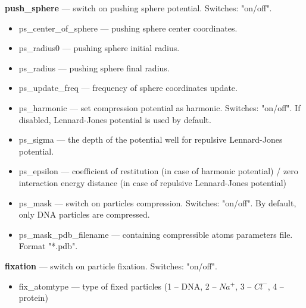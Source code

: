 \documentclass[12pt,a4paper]{article}
\begin{document}
{\bf push\_sphere} --- switch on pushing sphere potential. Switches: "on/off".
\begin{itemize}
\item ps\_center\_of\_sphere --- pushing sphere center coordinates.
\item ps\_radius0 --- pushing sphere initial radius.
\item ps\_radius --- pushing sphere final radius.
\item ps\_update\_freq --- frequency of sphere coordinates update.
\item ps\_harmonic --- set compression potential as harmonic. Switches: "on/off". If disabled, Lennard-Jones potential is used by default.
\item ps\_sigma --- the depth of the potential well for repulsive Lennard-Jones potential. 
\item ps\_epsilon --- coefficient of restitution (in case of harmonic potential) / zero interaction energy distance (in case of repulsive Lennard-Jones potential)
\item ps\_mask --- switch on particles compression. Switches: "on/off". By default, only DNA particles are compressed.
\item ps\_mask\_pdb\_filename --- containing compressible atoms parameters file. Format "*.pdb".
\end{itemize}

{\bf fixation} --- switch on particle fixation. Switches: "on/off".
\begin{itemize}
\item fix\_atomtype --- type of fixed particles (1 -- DNA, 2 -- $Na^+$, 3 -- $Cl^-$, 4 -- protein)
\end{itemize}
\end{document}
